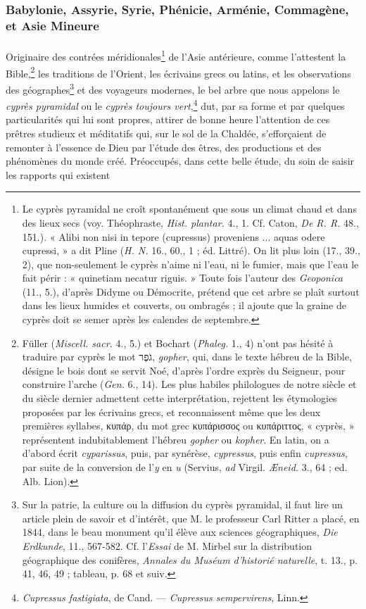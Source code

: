 \documentclass{article}
\begin{document}
\subsubsection{Babylonie, Assyrie, Syrie, Phénicie, Arménie, Commagène, et Asie Mineure}
\paragraph{}
Originaire des contrées méridionales\footnote{Le cyprès pyramidal ne croît spontanément que sous un climat chaud et dans des lieux secs (voy. Théophraste, \emph{Hist. plantar.} 4., 1. Cf. Caton, \emph{De R. R.} 48., 151.). « Alibi non nisi in tepore (cupressus) proveniens ... aquas odere cupressi, » a dit Pline (\emph{H. N.} 16., 60., 1 ; éd. Littré). On lit plus loin (17., 39., 2), que non-seulement le cyprès n'aime ni l'eau, ni le fumier, mais que l'eau le fait périr : « quinetiam necatur riguis. » Toute fois l'auteur des \emph{Geoponica} (11., 5.), d'après Didyme ou Démocrite, prétend que cet arbre se plaît surtout dans les lieux humides et couverts, ou ombragés ; il ajoute que la graine de cyprès doit se semer après les calendes de septembre.} de l'Asie antérieure, comme l'attestent la Bible,\footnote{Füller (\emph{Miscell. sacr.} 4., 5.) et Bochart (\emph{Phaleg.} 1., 4) n'ont pas hésité à traduire par cyprès le mot \texthebrew{גֹפֶר}, \emph{gopher}, qui, dans le texte hébreu de la Bible, désigne le bois dont se servit Noé, d'après l'ordre exprès du Seigneur, pour construire l'arche (\emph{Gen.} 6., 14). Les plus habiles philologues de notre siècle et du siècle dernier admettent cette interprétation, rejettent les étymologies proposées par les écrivains grecs, et reconnaissent même que les deux premières syllabes, \textgreek{κυπάρ}, du mot grec \textgreek{κυπάρισσος} ou \textgreek{κυπάριττος}, « cyprès, » représentent indubitablement l'hébreu \emph{gopher} ou \emph{kopher}. En latin, on a d'abord écrit \emph{cyparissus}, puis, par synérèse, \emph{cypressus}, puis enfin \emph{cupressus}, par suite de la conversion de l'\emph{y} en \emph{u} (Servius, \emph{ad} Virgil. \emph{Æneid.} 3., 64 ; ed. Alb. Lion).} les traditions de l'Orient, les écrivains grecs ou latins, et les observations des géographes\footnote{Sur la patrie, la culture ou la diffusion du cyprès pyramidal, il faut lire un article plein de savoir et d'intérêt, que M. le professeur Carl Ritter a placé, en 1844, dans le beau monument qu'il élève aux sciences géographiques, \emph{Die Erdkunde}, 11., 567-582. Cf. l'\emph{Essai} de M. Mirbel sur la distribution géographique des conifères, \emph{Annales du Muséum d'historié naturelle}, t. 13., p. 41, 46, 49 ; tableau, p. 68 et suiv.} et des voyageurs modernes, le bel arbre que nous appelons le \emph{cyprès pyramidal} ou le \emph{cyprès toujours vert},\footnote{\emph{Cupressus fastigiata}, de Cand. --- \emph{Cupressus sempervirens}, Linn.} dut, par sa forme et par quelques particularités qui lui sont propres, attirer de bonne heure l'attention de ces prêtres studieux et méditatifs qui, sur le sol de la Chaldée, s'efforçaient de remonter à l'essence de Dieu par l'étude des êtres, des productions et des phénomènes du monde créé. Préoccupés, dans cette belle étude, du soin de saisir les rapports qui existent 
\end{document}
